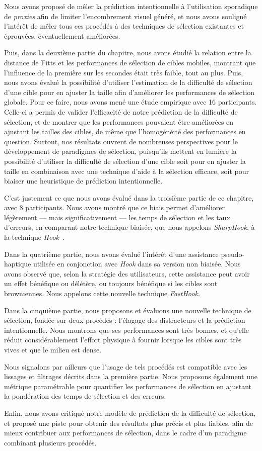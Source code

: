 	Nous avons proposé de mêler la prédiction intentionnelle à l'utilisation sporadique de \emph{proxies} afin de limiter l'encombrement visuel généré, et nous avons souligné l'intérêt de mêler tous ces procédés à des techniques de sélection existantes et éprouvées, éventuellement améliorées.
	
	Puis, dans la deuxième partie du chapitre, nous avons étudié la relation entre la distance de Fitts et les performances de sélection de cibles mobiles, montrant que l'influence de la première sur les secondes était très faible, tout au plus. Puis, nous avons évalué la possibilité d'utiliser l'estimation de la difficulté de sélection d'une cible pour en ajuster la taille afin d'améliorer les performances de sélection globale. Pour ce faire, nous avons mené une étude empirique avec 16 participants. Celle-ci a permis de valider l'efficacité de notre prédiction de la difficulté de sélection, et de montrer que les performances pouvaient être améliorées en ajustant les tailles des cibles, de même que l'homogénéité des performances en question. Surtout, nos résultats ouvrent de nombreuses perspectives pour le développement de paradigmes de sélection, puisqu'ils mettent en lumière la possibilité d'utiliser la difficulté de sélection d'une cible soit pour en ajuster la taille en combinaison avec une technique d'aide à la sélection efficace, soit pour biaiser une heuristique de prédiction intentionnelle.
	
	C'est justement ce que nous avons évalué dans la troisième partie de ce chapitre, avec 8 participants. Nous avons montré que ce biais permet d'améliorer légèrement --- mais significativement --- les temps de sélection et les taux d'erreurs, en comparant notre technique biaisée, que nous appelons \emph{SharpHook}, à la technique \emph{Hook}~\cite{ortega2013hook}.
	
	Dans la quatrième partie, nous avons évalué l'intérêt d'une assistance pseudo-haptique utilisée en conjonction avec \emph{Hook} dans sa version non biaisée. Nous avons observé que, selon la stratégie des utilisateurs, cette assistance peut avoir un effet bénéfique ou délétère, ou toujours bénéfique si les cibles sont browniennes. Nous appelons cette nouvelle technique \emph{FastHook}.
	
	Dans la cinquième partie, nous proposons et évaluons une nouvelle technique de sélection, fondée sur deux procédés : l'élagage des distracteurs et la prédiction intentionnelle. Nous montrons que ses performances sont très bonnes, et qu'elle réduit considérablement l'effort physique à fournir lorsque les cibles sont très vives et que le milieu est dense.
	
	Nous signalons par ailleurs que l'usage de tels procédés est compatible avec les lissages et filtrages décrits dans la première partie. Nous proposons également une métrique paramétrable pour quantifier les performances de sélection en ajustant la pondération des temps de sélection et des erreurs.
	
	Enfin, nous avons critiqué notre modèle de prédiction de la difficulté de sélection, et proposé une piste pour obtenir des résultats plus précis et plus fiables, afin de mieux contribuer aux performances de sélection, dans le cadre d'un paradigme combinant plusieurs procédés.
